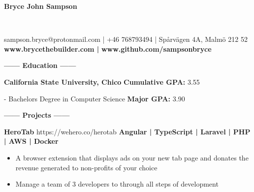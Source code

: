\documentclass[12pt]{article}
\begin{document}
\sffamily
\lsstyle
\color{white}
\center
\begin{Huge}\textbf{Bryce John Sampson}\end{Huge}\\
\medskip
\fontsize{12}{1.2}
\selectfont
\smallbreak
\colorbox{accent}{
    \parbox{45em}{
        \centering
        \color{secondary}
        sampson.bryce@protonmail.com | +46 768793494 | Spårvägen 4A, Malmö 212 52 \\
        \large
        \textbf{\color{primary}www.brycethebuilder.com |}
        \textbf{\color{primary}www.github.com/sampsonbryce}
    }
}
\smallskip
\center
\textbf{\Large------ Education ------}\\
\flushleft
\begin{footnotesize}
\textbf{California State University, Chico}
\hfill
\textbf{\color{primary}Cumulative GPA: }3.55\\

\smallskip
\begin{addmargin}[2em]{0em}

- Bachelors Degree in Computer Science
\hfill
\textbf{\color{primary}Major GPA: }3.90\\
\end{addmargin}

\smallskip

\end{footnotesize}

    \color{white}
    \vspace{-2mm}

    \begin{center}
    \textbf{\Large------ Projects ------}\\
    \end{center}
    
    \vspace{-5mm}
    \begin{footnotesize}

    \textbf{\color{primary}\large HeroTab }{\color{primary}\footnotesize https://wehero.co/herotab} \hfill \textbf{\color{Cerulean}Angular | TypeScript | Laravel | PHP | AWS | Docker}\\
    \begin{itemize}
        \item A browser extension that displays ads on your new tab page and donates the revenue generated to non-profits of your choice
        \item Manage a team of 3 developers to through all steps of development
    \end{itemize}

    \end{footnotesize}
\end{document}
